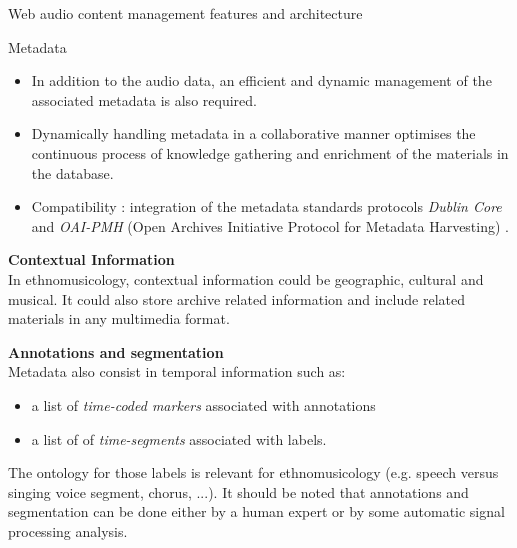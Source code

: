 \documentclass[final, hyperref, table]{beamer}
\begin{document}
\begin{frame}{}
\begin{columns}[t]
\begin{column}[T]{.49\linewidth}
\begin{block}{Web audio content management features and architecture}
\end{block}
\begin{block}{Metadata}\small
  \begin{itemize}
  \item In addition to the audio data, an efficient and dynamic
    management of the associated metadata is also required.
  \item Dynamically handling metadata in a collaborative manner optimises
    the continuous process of knowledge gathering and enrichment of
    the materials in the database.
  \item Compatibility : integration of the metadata standards protocols \emph{Dublin Core}
    and \emph{OAI-PMH} (Open Archives Initiative Protocol for Metadata
    Harvesting) \cite{DublinCore,OAI-PMH}.
  \end{itemize}

\textbf{Contextual Information}\\
In ethnomusicology, contextual information could be geographic, cultural and musical. It could also store archive related information and include related materials in any multimedia format. 

\textbf{Annotations and segmentation}\\
Metadata also consist in temporal information such as:
\begin{itemize}
\item a list of \emph{time-coded markers} associated with annotations
\item a list of of \emph{time-segments} associated with labels.
\end{itemize}
The ontology for those labels is relevant for ethnomusicology (e.g. speech versus singing voice segment, chorus, ...).
It should be noted that annotations and segmentation can be done either by a human expert or by some automatic signal processing analysis.

\end{block}
    \end{column}
   

\end{columns}
\end{frame}
\end{document}

